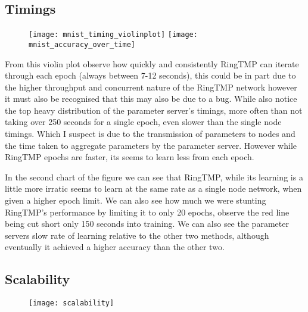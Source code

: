
\subsection{Timings}

\begin{figure}[h]
    \centering 
    \texttt{[image: mnist\_timing\_violinplot]}
    \texttt{[image: mnist\_accuracy\_over\_time]}

\end{figure}

From this violin plot observe how quickly and consistently RingTMP can iterate
through each epoch (always between 7-12 seconds), this could be in part due to
the higher throughput and concurrent nature of the RingTMP network however it
must also be recognised that this may also be due to a bug. While also notice
the top heavy distribution of the parameter server's timings, more often than not
taking over 250 seconds for a single epoch, even slower than the single node
timings. Which I suspect is due to the transmission of parameters to nodes and
the time taken to aggregate parameters by the parameter server. However while
RingTMP epochs are faster, its seems to learn less from each epoch.

In the second chart of the figure we can see that RingTMP, while its learning is
a little more irratic seems to learn at the same rate as a single node network, when
given a higher epoch limit. We can also see how much we were stunting RingTMP's
performance by limiting it to only 20 epochs, observe the red line being cut
short only 150 seconds into training. We can also see the parameter servers slow
rate of learning relative to the other two methods, although eventually it
achieved a higher accuracy than the other two.

\subsection{Scalability}
\begin{figure}[h]
    \centering
    \texttt{[image: scalability]}
\end{figure}

